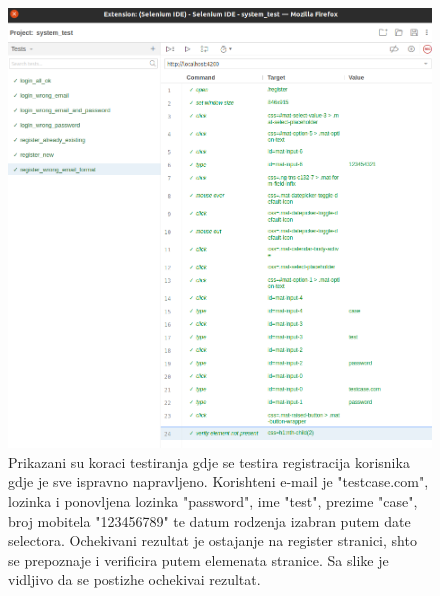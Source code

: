 {            \begin{figure}[H]
                \includegraphics[width=\textwidth]{slike/tests_system/register_wrong_format.png} %
                \caption{Prikazani su koraci testiranja gdje se testira registracija korisnika gdje je sve ispravno napravljeno. Korishteni e-mail je "testcase.com", lozinka i ponovljena lozinka "password", ime "test", prezime "case", broj mobitela "123456789" te datum rodzenja izabran putem date selectora. Ochekivani rezultat je ostajanje na register stranici, shto se prepoznaje i verificira putem elemenata stranice. Sa slike je vidljivo da se postizhe ochekivai rezultat.}
                \label{fig:struktura} %
            \end{figure}

}
